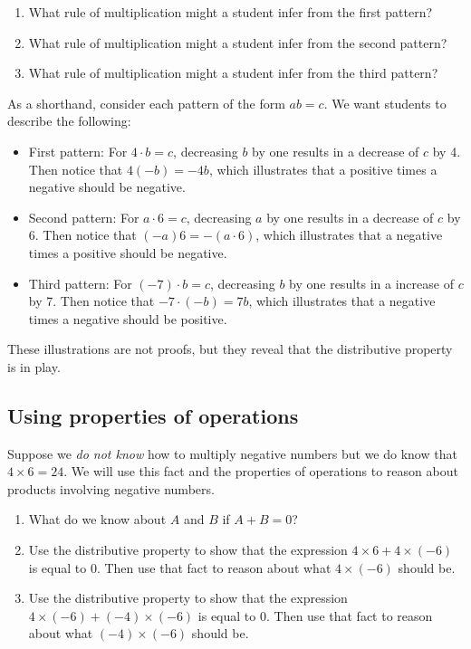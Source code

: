 \documentclass{ximera}
\begin{document}
\begin{problem}
\begin{enumerate}
\item What rule of multiplication might a student infer from the first pattern? 
\item What rule of multiplication might a student infer from the second pattern?
\item What rule of multiplication might a student infer from the third pattern?
\end{enumerate}
\begin{teachingnote}
As a shorthand, consider each pattern of the form $ab = c$.  We want students to describe the following:  
\begin{itemize}
\item First pattern:  For $4\cdot b = c$, decreasing $b$ by one results in a decrease of $c$ by 4.  Then notice that $4(-b) = -4b$, which illustrates that a positive times a negative should be negative. 
\item Second pattern:  For $a\cdot 6= c$, decreasing $a$ by one results in a decrease of $c$ by 6.  Then notice that $(-a)6 = -(a\cdot 6)$, which illustrates that a negative times a positive should be negative.  
\item Third pattern:  For $(-7)\cdot b= c$, decreasing $b$ by one results in a increase of $c$ by 7.  Then notice that $-7\cdot (-b) = 7b $, which illustrates that a negative times a negative should be positive. 
\end{itemize}
These illustrations are not proofs, but they reveal that the distributive property is in play.  
\end{teachingnote}
\end{problem}

\subsection*{Using properties of operations}

\begin{problem}
Suppose we \emph{do not know} how to multiply negative numbers but we do know that $4\times 6=24$. We will use this fact and the properties of operations to reason about products involving negative numbers.  
\begin{enumerate}
\item What do we know about $A$ and $B$ if $A+B=0$?  
\item Use the distributive property to show that the expression $4\times 6 + 4\times(-6)$ is equal to $0$.  
Then use that fact to reason about what $4\times(-6)$ should be.  
\item Use the distributive property to show that the expression $4\times (-6) + (-4)\times (-6)$ is equal to $0$.  
Then use that fact to reason about what $(-4)\times(-6)$ should be.  
\end{enumerate}
\end{problem}
\end{document}
